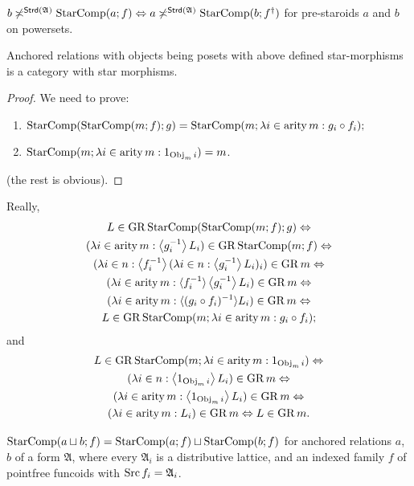 \begin{conjecture}
$b\not\asymp^{\mathsf{Strd}(\mathfrak{A})}\operatorname{StarComp}(a;f)\Leftrightarrow a\not\asymp^{\mathsf{Strd}(\mathfrak{A})}\operatorname{StarComp}(b;f^{\dagger})$
for pre-staroids $a$ and $b$ on powersets.\end{conjecture}
\begin{prop}
Anchored relations with objects being posets with above defined star-morphisms
is a category with star morphisms.\end{prop}
\begin{proof}
We need to prove:
\begin{enumerate}
\item $\operatorname{StarComp}(\operatorname{StarComp}(m;f);g)=\operatorname{StarComp}(m;\lambda i\in\operatorname{arity} m:g_{i}\circ f_{i});$
\item $\operatorname{StarComp}(m;\lambda i\in\operatorname{arity} m:1_{\operatorname{Obj}_{m}i})=m$.
\end{enumerate}
(the rest is obvious).
\end{proof}
Really, 
\begin{multline*}
L\in\operatorname{GR}\operatorname{StarComp}(\operatorname{StarComp}(m;f);g)\Leftrightarrow\\
(\lambda i\in\operatorname{arity} m:\left\langle g_{i}^{-1}\right\rangle L_{i})\in\operatorname{GR}\operatorname{StarComp}(m;f)\Leftrightarrow\\
(\lambda i\in n:\left\langle f_{i}^{-1}\right\rangle(\lambda i\in n:\left\langle g_{i}^{-1}\right\rangle L_{i})_{i})\in\operatorname{GR} m\Leftrightarrow\\
(\lambda i\in\operatorname{arity} m:\langle f_{i}^{-1}\rangle\left\langle g_{i}^{-1}\right\rangle L_{i})\in\operatorname{GR} m\Leftrightarrow\\
(\lambda i\in\operatorname{arity} m:\langle(g_{i}\circ f_{i})^{-1}\rangle L_{i})\in\operatorname{GR} m\Leftrightarrow\\
L\in\operatorname{GR}\operatorname{StarComp}(m;\lambda i\in\operatorname{arity} m:g_{i}\circ f_{i});
\end{multline*}
and
\begin{multline*}
L\in\operatorname{GR}\operatorname{StarComp}(m;\lambda i\in\operatorname{arity} m:1_{\operatorname{Obj}_{m}i})\Leftrightarrow\\
(\lambda i\in n:\left\langle 1_{\operatorname{Obj}_{m}i}\right\rangle L_{i})\in\operatorname{GR} m\Leftrightarrow\\
(\lambda i\in\operatorname{arity} m:\left\langle 1_{\operatorname{Obj}_{m}i}\right\rangle L_{i})\in\operatorname{GR} m\Leftrightarrow\\
(\lambda i\in\operatorname{arity} m:L_{i})\in\operatorname{GR} m\Leftrightarrow L\in\operatorname{GR} m.
\end{multline*}

\begin{conjecture}
$\operatorname{StarComp}(a\sqcup b;f)=\operatorname{StarComp}(a;f)\sqcup\operatorname{StarComp}(b;f)$ for anchored
relations $a$, $b$ of a form $\mathfrak{A}$, where every $\mathfrak{A}_{i}$
is a distributive lattice, and an indexed family $f$ of pointfree
funcoids with $\operatorname{Src} f_{i}=\mathfrak{A}_{i}$.
\end{conjecture}

